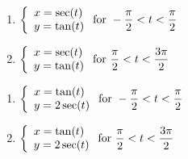 \begin{multicols}{2} \raggedcolumns 
\begin{enumerate}
\setcounter{enumi}{\value{HW}}

\item ${\displaystyle \left\{ \begin{array}{l} x = \sec(t) \\ y = \tan(t) \end{array} \right. \vspace{.25in} \mbox{for } -\dfrac{\pi}{2} < t < \dfrac{\pi}{2}}$
\item ${\displaystyle \left\{ \begin{array}{l} x = \sec(t) \\ y = \tan(t) \end{array} \right. \vspace{.25in} \mbox{for } \dfrac{\pi}{2} < t < \dfrac{3\pi}{2}}$

\setcounter{HW}{\value{enumi}}
\end{enumerate}
\end{multicols}

\begin{multicols}{2} \raggedcolumns 
\begin{enumerate}
\setcounter{enumi}{\value{HW}}

\item ${\displaystyle \left\{ \begin{array}{l} x = \tan(t) \\ y = 2\sec(t) \end{array} \right. \vspace{.25in} \mbox{for } -\dfrac{\pi}{2} < t < \dfrac{\pi}{2}}$
\item ${\displaystyle \left\{ \begin{array}{l} x = \tan(t) \\ y = 2\sec(t) \end{array} \right. \vspace{.25in} \mbox{for } \dfrac{\pi}{2} < t < \dfrac{3\pi}{2}}$

\setcounter{HW}{\value{enumi}}
\end{enumerate}
\end{multicols}


